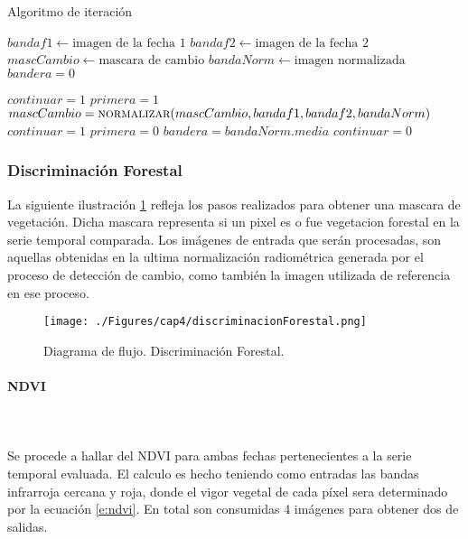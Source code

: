 \begin{algorithm}
	\caption{Algoritmo de iteraci\'on}
	\label{alg:iteracionAlg}
	\begin{algorithmic}[1]
	\Statex
	
	\State $ bandaf1 \gets \text{imagen de la fecha 1} $ 
	\State $ bandaf2 \gets \text{imagen de la fecha 2} $ 
	\State $ mascCambio \gets \text{mascara de cambio} $ 
	\State $ bandaNorm \gets \text{imagen normalizada} $ 
	\State $ bandera = 0$

	
	\State 
	\State $ continuar = 1 $ 
	\State $ primera = 1 $ 
			\State $ mascCambio = \textsc{normalizar}(mascCambio,bandaf1,bandaf2,bandaNorm)$ 
				\State $ continuar = 1 $ 
				\State $ primera = 0 $ 
				\State $ bandera = bandaNorm.media $
			\Else
				\State $continuar = 0$
			\EndIf
	\EndWhile
	
	\end{algorithmic}
\end{algorithm}


\subsubsection{Discriminaci\'on Forestal}
La siguiente ilustraci\'on \ref{fig:discrimForestal} refleja los pasos realizados para obtener una mascara de vegetaci\'on. Dicha mascara representa si un pixel es o fue vegetacion forestal en la serie temporal comparada. Los im\'agenes de entrada que ser\'an procesadas, son aquellas obtenidas en la ultima normalizaci\'on radiom\'etrica generada por el proceso de detecci\'on de cambio, como tambi\'en la imagen utilizada de referencia en ese proceso.
\begin{figure}[H]
	\centering
	\texttt{[image: ./Figures/cap4/discriminacionForestal.png]}
	\caption{Diagrama de flujo. Discriminaci\'on Forestal.}
	\label{fig:discrimForestal}
\end{figure}

\paragraph{NDVI}\mbox{}\\\mbox{}\\
Se procede a hallar del NDVI para ambas fechas pertenecientes a la serie temporal evaluada. El calculo es hecho teniendo como entradas las bandas infrarroja cercana y roja, donde el vigor vegetal de cada p\'ixel sera determinado por la ecuaci\'on \ref{e:ndvi}. En total son consumidas 4 im\'agenes para obtener dos de salidas.
